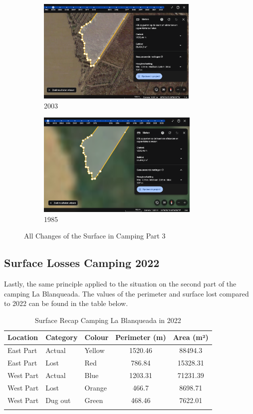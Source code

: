 \begin{figure}[H]
    \centering
    \begin{subfigure}[b]{0.48\textwidth}
        \includegraphics[width=\linewidth, height =5cm]{figures/appendix-g/opp2003.png}
        \caption{2003}
        \label{fig:second}
    \end{subfigure}
    \hfill
    \begin{subfigure}[b]{0.48\textwidth}
        \includegraphics[width=\linewidth, height =5cm]{figures/appendix-g/opp1985.png}
        \caption{1985}
        \label{fig:second}
    \end{subfigure}
        \caption{All Changes of the Surface in Camping Part 3}
    \label{fig:All Changes of the Surface in Camping Part 3}
\end{figure} 

\subsection{Surface Losses Camping 2022}
Lastly, the same principle applied to the situation on the second part of the camping La Blanqueada. The values of the perimeter and surface lost compared to  2022 can be found in the table below. 

\begin{table}[H]
\centering
\caption{Surface Recap Camping La Blanqueada in 2022}
\label{tab:Surface Lost Camping La Blanqueada in 2022}
\begin{tabular}{l l l S[table-format=5.2] S[table-format=5.2]}
\toprule
Location & Category & Colour & Perimeter (m) & Area (m²) \\
\midrule
East Part & Actual & Yellow & 1520.46 & 88494.3 \\
East Part & Lost & Red & 786.84 & 15328.31 \\
West Part & Actual & Blue & 1203.31 & 71231.39 \\
West Part & Lost & Orange & 466.7 & 8698.71 \\
West Part & Dug out & Green & 468.46 & 7622.01\\
\bottomrule
\label{Table: Surface Recap Camping La Blanqueada in 2022}
\end{tabular}
\end{table}

